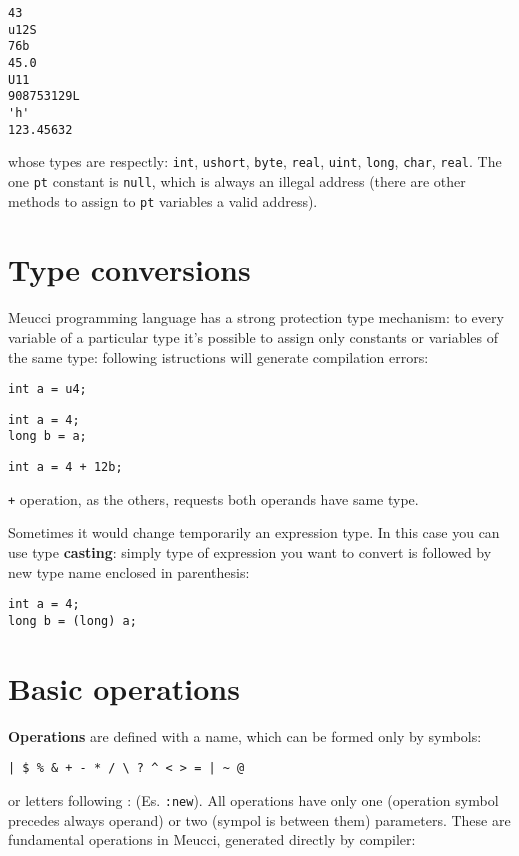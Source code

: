 \documentclass[10pt]{book}%
\newcommand{\code}[1]{\texttt{#1}}
\renewcommand{\emph}[1]{\textbf{#1}}
\newenvironment{codeenv}{
\begin{mdframed}[backgroundcolor=black!20,topline=false,leftline=false,rightline=false,bottomline=false]
}
{\end{mdframed}}
\begin{document}
\begin{codeenv}
\begin{verbatim}
43
u12S
76b
45.0
U11
908753129L
'h'
123.45632
\end{verbatim}
\end{codeenv}
whose types are respectly: \code{int}, \code{ushort}, \code{byte}, \code{real}, \code{uint}, \code{long}, \code{char}, \code{real}. The one \code{pt} constant is \code{null}, which is always an illegal address (there are other methods to assign to \code{pt} variables a valid address).

\section{Type conversions}
Meucci programming language has a strong protection type mechanism: to every variable of a particular type it's possible to assign only constants or variables of the same type: following istructions will generate compilation errors:
\begin{codeenv}
\begin{verbatim}
int a = u4;
\end{verbatim}
\end{codeenv}

\begin{codeenv}
\begin{verbatim}
int a = 4;
long b = a;
\end{verbatim}
\end{codeenv}

\begin{codeenv}
\begin{verbatim}
int a = 4 + 12b;
\end{verbatim}
\end{codeenv}
\code + operation, as the others, requests both operands have same type.

Sometimes it would change temporarily an expression type. In this case you can use type \emph{casting}: simply type of expression you want to convert is followed by new type name enclosed in parenthesis:

\begin{codeenv}
\begin{verbatim}
int a = 4;
long b = (long) a;
\end{verbatim}
\end{codeenv}

\section{Basic operations}
\emph{Operations} are defined with a name, which can be formed only by symbols:
\begin{verbatim}
| $ % & + - * / \ ? ^ < > = | ~ @
\end{verbatim}
or letters following : (Es. \code{:new}). All operations have only one (operation symbol precedes always operand) or two (sympol is between them) parameters. These are fundamental operations in Meucci, generated directly by compiler:
\end{document}
